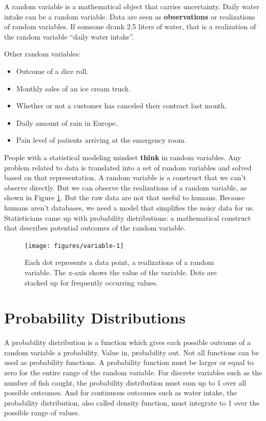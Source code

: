 \documentclass[
  10pt,
]{scrbook}
\providecommand{\tightlist}{%
  \setlength{\itemsep}{0pt}\setlength{\parskip}{0pt}}
\begin{document}
A random variable is a mathematical object that carries uncertainty.
Daily water intake can be a random variable.
Data are seen as \textbf{observations} or realizations of random variables.
If someone drank 2.5 liters of water, that is a realization of the random variable ``daily water intake''.

Other random variables:

\begin{itemize}
\tightlist
\item
  Outcome of a dice roll.
\item
  Monthly sales of an ice cream truck.
\item
  Whether or not a customer has canceled their contract last month.
\item
  Daily amount of rain in Europe.
\item
  Pain level of patients arriving at the emergency room.
\end{itemize}

People with a statistical modeling mindset \textbf{think} in random variables.
Any problem related to data is translated into a set of random variables and solved based on that representation.
A random variable is a construct that we can't observe directly.
But we can observe the realizations of a random variable, as shown in Figure \ref{fig:variable}.
But the raw data are not that useful to humans.
Because humans aren't databases, we need a model that simplifies the noisy data for us.
Statisticians came up with probability distributions: a mathematical construct that describes potential outcomes of the random variable.

\begin{figure}

{\centering \texttt{[image: figures/variable-1]} 

}

\caption{Each dot represents a data point, a realizations of a random variable. The x-axis shows the value of the variable. Dots are stacked up for frequently occurring values. }\label{fig:variable}
\end{figure}

\hypertarget{probability-distributions}{%
\section{Probability Distributions}\label{probability-distributions}}

A probability distribution is a function which gives each possible outcome of a random variable a probability.
Value in, probability out.
Not all functions can be used as probability functions.
A probability function must be larger or equal to zero for the entire range of the random variable.
For discrete variables such as the number of fish caught, the probability distribution must sum up to 1 over all possible outcomes.
And for continuous outcomes such as water intake, the probability distribution, also called density function, must integrate to 1 over the possible range of values.
\end{document}
